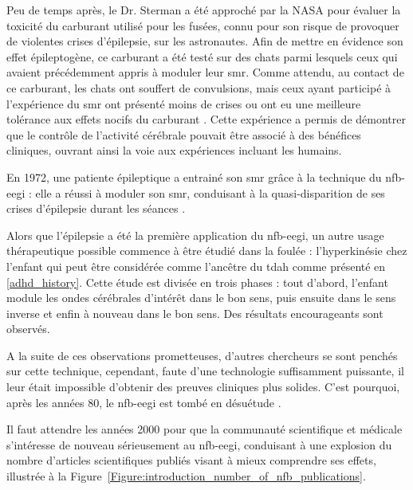 Peu de temps après, le Dr. Sterman a été approché par la NASA pour évaluer la toxicité du carburant utilisé pour les fusées, connu pour son risque de provoquer de violentes crises
d'épilepsie, sur les astronautes. Afin de mettre en évidence son effet épileptogène, ce carburant a été testé sur des chats parmi lesquels ceux qui avaient précédemment appris 
à moduler leur \gls{smr}. Comme attendu, au contact de ce carburant, les chats
ont souffert de convulsions, mais ceux ayant participé à l'expérience du \gls{smr} ont présenté moins de crises ou ont eu une meilleure tolérance aux effets nocifs du carburant \citep{Sterman1974}.  
Cette expérience a permis de démontrer que le contrôle de l'activité cérébrale pouvait être associé à des bénéfices cliniques, ouvrant ainsi la voie aux expériences incluant les humains.

En 1972, une patiente épileptique a entrainé son \gls{smr} grâce à la technique du \gls{nfb}-\gls{eegi} : elle a réussi à moduler son \gls{smr}, conduisant à la quasi-disparition de ses crises 
d'épilepsie durant les séances \citep{Sterman1974}. 

Alors que l'épilepsie a été la première application du \gls{nfb}-\gls{eegi}, un autre usage thérapeutique possible commence à être étudié dans la foulée : l'hyperkinésie chez l'enfant \citet{Lubar1976ADHD}
qui peut être considérée comme l'ancêtre du \gls{tdah} comme présenté en \ref{adhd_history}. Cette étude est divisée en trois phases : tout d'abord, l'enfant module les ondes cérébrales d'intérêt 
dans le bon sens, puis ensuite dans le sens inverse et enfin à nouveau dans le bon sens. Des résultats encourageants sont observés.

A la suite de ces observations prometteuses, d'autres chercheurs se sont penchés sur cette technique, cependant, faute d'une technologie suffisamment puissante, il leur était impossible
d'obtenir des preuves cliniques plus solides. C'est pourquoi, après les années 80, le \gls{nfb}-\gls{eegi} est tombé en désuétude \citep{Masterpasqua2003}.
 
Il faut attendre les années 2000 pour que la communauté scientifique et médicale s'intéresse de nouveau sérieusement au \gls{nfb}-\gls{eegi}, conduisant à une explosion du nombre d'articles scientifiques publiés 
visant à mieux comprendre ses effets, illustrée à la Figure~\ref{Figure:introduction_number_of_nfb_publications}. 

